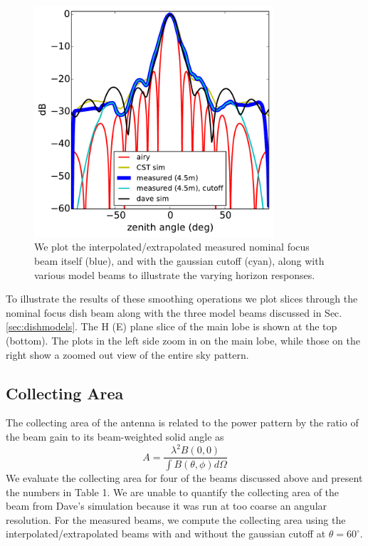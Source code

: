 \documentclass{emulateapj}
\begin{document}
\begin{figure}[h]
\includegraphics[width=3.5in]{ew_beams_slice.pdf}
\caption{We plot the interpolated/extrapolated measured nominal focus  beam itself (blue), and with the gaussian cutoff (cyan), along with various model beams to illustrate the varying horizon responses. }
\label{fig:interpbeamsslice}
\end{figure}

To illustrate the results of these smoothing operations we plot slices through the nominal focus dish beam along with the three model beams discussed in Sec. \ref{sec:dishmodels}. The H (E) plane slice of the main lobe is shown at the top (bottom). The plots in the left side zoom in on the main lobe, while those on the right show a zoomed out view of the entire sky pattern. 

\subsection{Collecting Area}

The collecting area of the antenna is related to the power pattern by the ratio of the beam gain to its beam-weighted solid angle as
\begin{equation}
	A=\frac{\lambda^2 B(0,0)}{\int B(\theta,\phi)d\Omega}
\end{equation}
We evaluate the collecting area for four of the beams discussed above and present the numbers in Table 1. We are unable to quantify the collecting area of the beam from Dave's simulation because it was run at too coarse an angular resolution. For the measured beams, we compute the collecting area using the interpolated/extrapolated beams with and without the gaussian cutoff at $\theta=60^\circ$.
\end{document}
